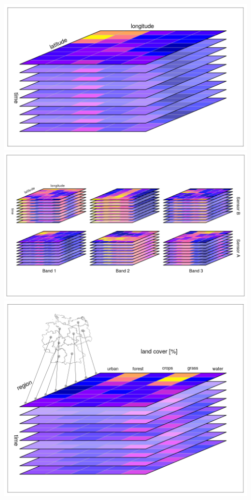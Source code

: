 \documentclass{beamer}
\begin{document}
\begin{frame}{}
\begin{columns}[t]
\begin{column}{.6\linewidth}
      \end{column}
      
      \begin{column}{.18\linewidth}
      \vspace{2.5cm}\\
      \includegraphics[width=\columnwidth]{cube1.png}\\
      \includegraphics[width=\columnwidth]{cube2.png}\\
      \includegraphics[width=\columnwidth]{cube3.png}\\

\end{column}
\end{columns}
\end{frame}
\end{document}
